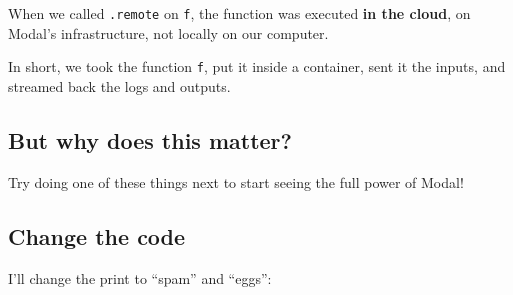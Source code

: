 \documentclass[
  letterpaper,
  DIV=11,
  numbers=noendperiod]{scrreprt}
\begin{document}
When we called \texttt{.remote} on \texttt{f}, the function was executed
\textbf{in the cloud}, on Modal's infrastructure, not locally on our
computer.

In short, we took the function \texttt{f}, put it inside a container,
sent it the inputs, and streamed back the logs and outputs.

\hypertarget{but-why-does-this-matter}{%
\subsection{But why does this matter?}\label{but-why-does-this-matter}}

Try doing one of these things next to start seeing the full power of
Modal!

\hypertarget{change-the-code}{%
\subsection{Change the code}\label{change-the-code}}

I'll change the print to ``spam'' and ``eggs'':
\end{document}

